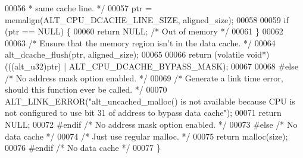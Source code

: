 \begin{DoxyCode}
00056 \textcolor{comment}{   * same cache line. */} 
00057   ptr = memalign(ALT\_CPU\_DCACHE\_LINE\_SIZE, aligned\_size);
00058 
00059   \textcolor{keywordflow}{if} (ptr == NULL) \{
00060     \textcolor{keywordflow}{return} NULL; \textcolor{comment}{/* Out of memory */}
00061   \}
00062 
00063   \textcolor{comment}{/* Ensure that the memory region isn't in the data cache. */}
00064   alt_dcache_flush(ptr, aligned\_size);
00065 
00066   \textcolor{keywordflow}{return} (\textcolor{keyword}{volatile} \textcolor{keywordtype}{void}*) (((alt_u32)ptr) | ALT\_CPU\_DCACHE\_BYPASS\_MASK);
00067 
00068 \textcolor{preprocessor}{#else }\textcolor{comment}{/* No address mask option enabled. */}\textcolor{preprocessor}{}
00069   \textcolor{comment}{/* Generate a link time error, should this function ever be called. */}
00070   ALT_LINK_ERROR(\textcolor{stringliteral}{"alt\_uncached\_malloc() is not available because CPU is not configured to use bit 31 of
       address to bypass data cache"});
00071   \textcolor{keywordflow}{return} NULL;
00072 \textcolor{preprocessor}{#endif }\textcolor{comment}{/* No address mask option enabled. */}\textcolor{preprocessor}{}
00073 \textcolor{preprocessor}{#else }\textcolor{comment}{/* No data cache */}\textcolor{preprocessor}{}
00074   \textcolor{comment}{/* Just use regular malloc. */}
00075   \textcolor{keywordflow}{return} malloc(size);
00076 \textcolor{preprocessor}{#endif }\textcolor{comment}{/* No data cache */}\textcolor{preprocessor}{}
00077 \}
\end{DoxyCode}
